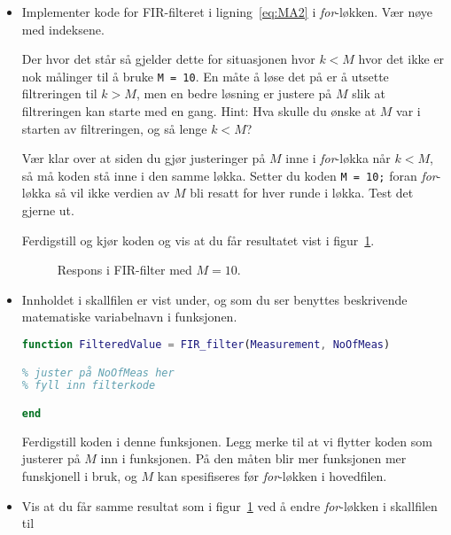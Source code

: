 \begin{itemize}
\item  Implementer kode for
  FIR-filteret i ligning~\eqref{eq:MA2} i {\it for}-løkken. Vær nøye med
  indeksene.
  
  Der hvor det står {\color{darkgreen}} så gjelder dette
  for situasjonen hvor $k{<}M$ hvor det ikke er nok
  målinger til å bruke {\tt M = 10}. En måte å løse det på er å utsette
  filtreringen til $k{>}M$, men en bedre løsning er justere på $M$
  slik at filtreringen kan starte med en gang.
  Hint: Hva skulle du ønske at
  $M$ var i starten av filtreringen, og så lenge $k{<}M$?

  Vær
  klar over at siden du gjør justeringer på $M$ inne i {\it for}-løkka
  når $k < M$, så må koden  stå inne i den samme
  løkka. Setter du koden {\tt M = 10;} foran {\it for}-løkka så vil
  ikke verdien av $M$ bli resatt for hver runde i løkka. Test det
  gjerne ut.

\newpage
  Ferdigstill og kjør koden og vis at du får  resultatet vist i figur~\ref{fig:3i}.
    \begin{figure}[H]
      \centering
      \hspace*{0mm}
      \caption{Respons i FIR-filter med $M{=}10$. }
      \label{fig:3i}
    \end{figure}
    
    
\item Innholdet  i skallfilen  er
  vist under, og som du ser benyttes beskrivende matematiske
  variabelnavn i  funksjonen. 

\begin{lstlisting}[caption={Skall for funksjonen for FIR-filtrering.},
 language= Matlab,   label=kode:FIR_funk,
numbers=none] 
function FilteredValue = FIR_filter(Measurement, NoOfMeas)

% juster på NoOfMeas her
% fyll inn filterkode

end
\end{lstlisting}
Ferdigstill koden i denne funksjonen. 
  Legg merke til at vi flytter 
  koden som justerer på $M$ inn i funksjonen. På den måten  blir mer
  funksjonen mer funskjonell i bruk, og $M$ kan spesifiseres 
  før  {\it for}-løkken i hovedfilen.
  

\item Vis at du får samme resultat som i figur~\ref{fig:3i} ved å
  endre {\it for}-løkken i skallfilen til
  

\end{itemize}
